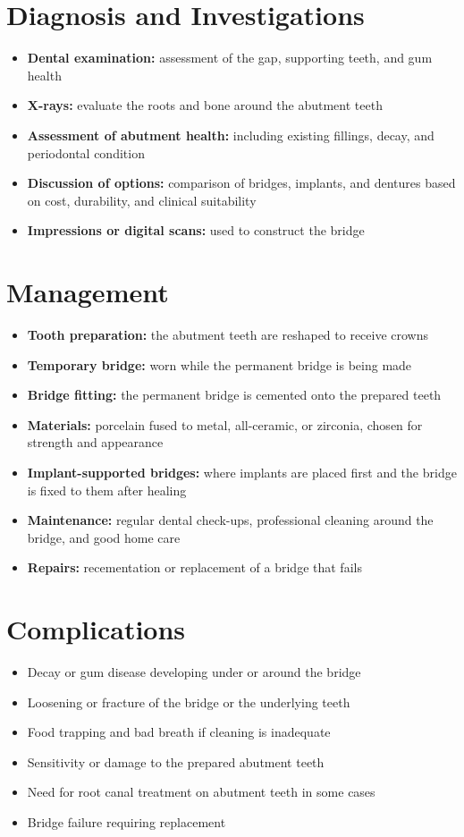 \section*{Diagnosis and Investigations}
\begin{itemize}
    \item \textbf{Dental examination:} assessment of the gap, supporting teeth, and gum health
    \item \textbf{X-rays:} evaluate the roots and bone around the abutment teeth
    \item \textbf{Assessment of abutment health:} including existing fillings, decay, and periodontal condition
    \item \textbf{Discussion of options:} comparison of bridges, implants, and dentures based on cost, durability, and clinical suitability
    \item \textbf{Impressions or digital scans:} used to construct the bridge
\end{itemize}

\section*{Management}
\begin{itemize}
    \item \textbf{Tooth preparation:} the abutment teeth are reshaped to receive crowns
    \item \textbf{Temporary bridge:} worn while the permanent bridge is being made
    \item \textbf{Bridge fitting:} the permanent bridge is cemented onto the prepared teeth
    \item \textbf{Materials:} porcelain fused to metal, all-ceramic, or zirconia, chosen for strength and appearance
    \item \textbf{Implant-supported bridges:} where implants are placed first and the bridge is fixed to them after healing
    \item \textbf{Maintenance:} regular dental check-ups, professional cleaning around the bridge, and good home care
    \item \textbf{Repairs:} recementation or replacement of a bridge that fails
\end{itemize}

\section*{Complications}
\begin{itemize}
    \item Decay or gum disease developing under or around the bridge
    \item Loosening or fracture of the bridge or the underlying teeth
    \item Food trapping and bad breath if cleaning is inadequate
    \item Sensitivity or damage to the prepared abutment teeth
    \item Need for root canal treatment on abutment teeth in some cases
    \item Bridge failure requiring replacement
\end{itemize}

